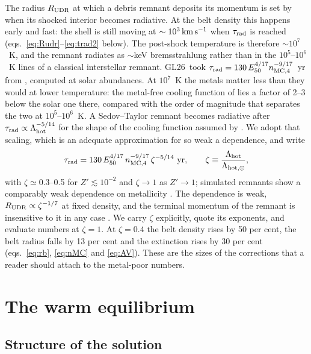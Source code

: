 \documentclass[twocolumn,pdftex]{aastex701}
\newcommand{\Zp}{Z'}
\newcommand{\GL}{GL26}
\newcommand{\kms}{\,{\rm km\,s^{-1}}}
\begin{document}
The radius $R_{\rm UDR}$ at which a debris remnant deposits its momentum is set by when its shocked interior becomes radiative. At the belt density this happens early and fast: the shell is still moving at $\sim10^{3}\kms$ when $\tau_{\rm rad}$ is reached (eqs.~\ref{eq:Rudr}--\ref{eq:trad2} below). The post-shock temperature is therefore $\sim10^{7}$~K, and the remnant radiates as $\sim$keV bremsstrahlung rather than in the $10^{5}$--$10^{6}$~K lines of a classical interstellar remnant. \GL\ took $\tau_{\rm rad} = 130\,E_{50}^{4/17}n_{\rm MC,4}^{-9/17}$~yr from \citet{Blondin:1998a}, computed at solar abundances. At $10^{7}$~K the metals matter less than they would at lower temperature: the metal-free cooling function of \citet{Sutherland:1993a} lies a factor of 2--3 below the solar one there, compared with the order of magnitude that separates the two at $10^{5}$--$10^{6}$~K. A Sedov--Taylor remnant becomes radiative after $\tau_{\rm rad}\propto\Lambda_{\rm hot}^{-5/14}$ for the shape of the cooling function assumed by \citet{Cioffi:1988a}. We adopt that scaling, which is an adequate approximation for so weak a dependence, and write
\begin{equation}
\tau_{\rm rad} = 130\,E_{50}^{4/17}\,n_{\rm MC,4}^{-9/17}\,\zeta^{-5/14}\ {\rm yr},\qquad \zeta\equiv\frac{\Lambda_{\rm hot}}{\Lambda_{\rm hot,\odot}},
\label{eq:trad}
\end{equation}
with $\zeta\simeq0.3$--0.5 for $\Zp\lesssim10^{-2}$ and $\zeta\to1$ as $\Zp\to1$; simulated remnants show a comparably weak dependence on metallicity \citep{Thornton:1998a}. The dependence is weak, $R_{\rm UDR}\propto\zeta^{-1/7}$ at fixed density, and the terminal momentum of the remnant is insensitive to it in any case \citep{Kim:2015a}. We carry $\zeta$ explicitly, quote its exponents, and evaluate numbers at $\zeta=1$. At $\zeta=0.4$ the belt density rises by 50 per cent, the belt radius falls by 13 per cent and the extinction rises by 30 per cent (eqs.~\ref{eq:rb}, \ref{eq:nMC} and \ref{eq:AV}). These are the sizes of the corrections that a reader should attach to the metal-poor numbers.

\section{The warm equilibrium}\label{sec:equilibrium}

\subsection{Structure of the solution}\label{sec:structure}
\end{document}
